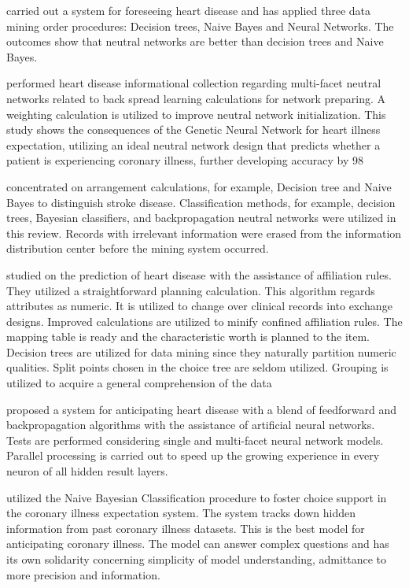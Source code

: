 {\citealp{dangare2012improved} carried out a system for foreseeing heart disease and has applied three data mining order procedures: Decision trees, Naive Bayes and Neural Networks. The outcomes show that neutral networks are better than decision trees and Naive Bayes.

\citealp{waghulde2014genetic} performed heart disease informational collection regarding multi-facet neutral networks related to back spread learning calculations for network preparing. A weighting calculation is utilized to improve neutral network initialization. This study shows the consequences of the Genetic Neural Network for heart illness expectation, utilizing an ideal neutral network design that predicts whether a patient is experiencing coronary illness, further developing accuracy by 98%

\citealp{sudha2012effective} concentrated on arrangement calculations, for example, Decision tree and Naive Bayes to distinguish stroke disease. Classification methods, for example, decision trees, Bayesian classifiers, and backpropagation neutral networks were utilized in this review. Records with irrelevant information were erased from the information distribution center before the mining system occurred.

\citealp{ordonez2001mining} studied on the prediction of heart disease with the assistance of affiliation rules. They utilized a straightforward planning calculation. This algorithm regards attributes as numeric. It is utilized to change over clinical records into exchange designs. Improved calculations are utilized to minify confined affiliation rules. The mapping table is ready and the characteristic worth is planned to the item. Decision trees are utilized for data mining since they naturally partition numeric qualities. Split points chosen in the choice tree are seldom utilized. Grouping is utilized to acquire a general comprehension of the data


\citealp{babu2017heart} proposed a system for anticipating heart disease with a blend of feedforward and backpropagation algorithms with the assistance of artificial neural networks. Tests are performed considering single and multi-facet neural network models. Parallel processing is carried out to speed up the growing experience in every neuron of all hidden result layers.


\citealp{pattekari2012prediction} utilized the Naive Bayesian Classification procedure to foster choice support in the coronary illness expectation system. The system tracks down hidden information from past coronary illness datasets. This is the best model for anticipating coronary illness. The model can answer complex questions and has its own solidarity concerning simplicity of model understanding, admittance to more precision  and information.

}
